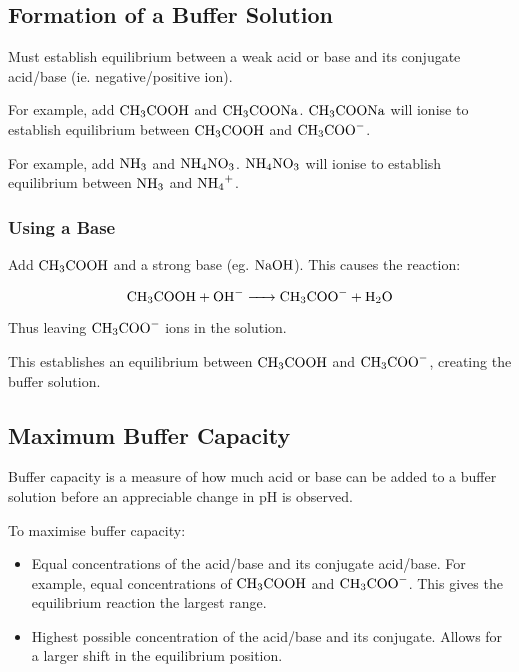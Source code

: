 \documentclass[a4paper,11pt]{article}
\begin{document}
\subsection{Formation of a Buffer Solution}

Must establish equilibrium between a weak acid or base and its conjugate
acid/base (ie. negative/positive ion).

For example, add $\ce{CH3COOH}$ and $\ce{CH3COONa}$. $\ce{CH3COONa}$ will ionise
to establish equilibrium between $\ce{CH3COOH}$ and $\ce{CH3COO-}$.

For example, add $\ce{NH3}$ and $\ce{NH4NO3}$. $\ce{NH4NO3}$ will ionise to
establish equilibrium between $\ce{NH3}$ and $\ce{NH4+}$.


\subsubsection{Using a Base}

Add $\ce{CH3COOH}$ and a strong base (eg. $\ce{NaOH}$). This causes the
reaction:

$$
\ce{CH3COOH + OH- -> CH3COO- + H2O}
$$

Thus leaving $\ce{CH3COO-}$ ions in the solution.

This establishes an equilibrium between $\ce{CH3COOH}$ and $\ce{CH3COO-}$,
creating the buffer solution.


\subsection{Maximum Buffer Capacity}

Buffer capacity is a measure of how much acid or base can be added to a
buffer solution before an appreciable change in pH is observed.

To maximise buffer capacity:

\begin{itemize}
\item Equal concentrations of the acid/base and its conjugate acid/base. For
	example, equal concentrations of $\ce{CH3COOH}$ and $\ce{CH3COO-}$. This
	gives the equilibrium reaction the largest range.
\item Highest possible concentration of the acid/base and its conjugate. Allows
	for a larger shift in the equilibrium position.
\end{itemize}
\end{document}
